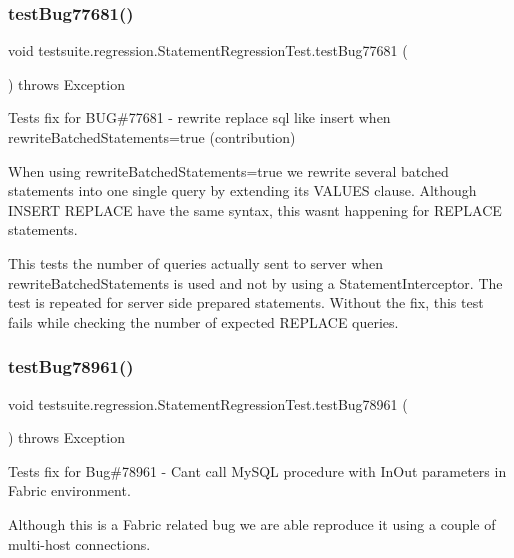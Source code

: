 \subsubsection{\texorpdfstring{test\+Bug77681()}{testBug77681()}}
{\footnotesize\ttfamily void testsuite.\+regression.\+Statement\+Regression\+Test.\+test\+Bug77681 (\begin{DoxyParamCaption}{ }\end{DoxyParamCaption}) throws Exception}

Tests fix for B\+UG\#77681 -\/ rewrite replace sql like insert when rewrite\+Batched\+Statements=true (contribution)

When using \textquotesingle{}rewrite\+Batched\+Statements=true\textquotesingle{} we rewrite several batched statements into one single query by extending its V\+A\+L\+U\+ES clause. Although I\+N\+S\+E\+RT R\+E\+P\+L\+A\+CE have the same syntax, this wasn\textquotesingle{}t happening for R\+E\+P\+L\+A\+CE statements.

This tests the number of queries actually sent to server when rewrite\+Batched\+Statements is used and not by using a Statement\+Interceptor. The test is repeated for server side prepared statements. Without the fix, this test fails while checking the number of expected R\+E\+P\+L\+A\+CE queries. \mbox{\label{classtestsuite_1_1regression_1_1_statement_regression_test_a0813e2cf77078b1f8476ef827c5c9046}} 
\subsubsection{\texorpdfstring{test\+Bug78961()}{testBug78961()}}
{\footnotesize\ttfamily void testsuite.\+regression.\+Statement\+Regression\+Test.\+test\+Bug78961 (\begin{DoxyParamCaption}{ }\end{DoxyParamCaption}) throws Exception}

Tests fix for Bug\#78961 -\/ Can\textquotesingle{}t call My\+S\+QL procedure with In\+Out parameters in Fabric environment.

Although this is a Fabric related bug we are able reproduce it using a couple of multi-\/host connections. \mbox{\label{classtestsuite_1_1regression_1_1_statement_regression_test_a338c926f02a641b1cabb27021e7e06e4}} 
